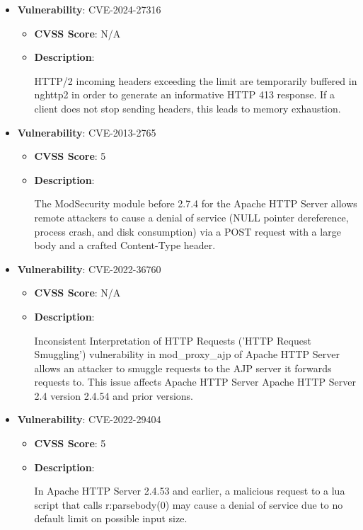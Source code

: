 \documentclass{article}
\begin{document}
\begin{itemize}
    
        \item \textbf{Vulnerability}: CVE-2024-27316
        \begin{itemize}
            \item \textbf{CVSS Score}:  N/A 
            \item \textbf{Description}:
            \parbox[t]{0.9\linewidth}{
                \ttfamily HTTP/2 incoming headers exceeding the limit are temporarily buffered in nghttp2 in order to generate an informative HTTP 413 response. If a client does not stop sending headers, this leads to memory exhaustion.
            }
        \end{itemize}
    
        \item \textbf{Vulnerability}: CVE-2013-2765
        \begin{itemize}
            \item \textbf{CVSS Score}:  5 
            \item \textbf{Description}:
            \parbox[t]{0.9\linewidth}{
                \ttfamily The ModSecurity module before 2.7.4 for the Apache HTTP Server allows remote attackers to cause a denial of service (NULL pointer dereference, process crash, and disk consumption) via a POST request with a large body and a crafted Content-Type header.
            }
        \end{itemize}
    
        \item \textbf{Vulnerability}: CVE-2022-36760
        \begin{itemize}
            \item \textbf{CVSS Score}:  N/A 
            \item \textbf{Description}:
            \parbox[t]{0.9\linewidth}{
                \ttfamily Inconsistent Interpretation of HTTP Requests ('HTTP Request Smuggling') vulnerability in mod\_proxy\_ajp of Apache HTTP Server allows an attacker to smuggle requests to the AJP server it forwards requests to.  This issue affects Apache HTTP Server Apache HTTP Server 2.4 version 2.4.54 and prior versions.
            }
        \end{itemize}
    
        \item \textbf{Vulnerability}: CVE-2022-29404
        \begin{itemize}
            \item \textbf{CVSS Score}:  5 
            \item \textbf{Description}:
            \parbox[t]{0.9\linewidth}{
                \ttfamily In Apache HTTP Server 2.4.53 and earlier, a malicious request to a lua script that calls r:parsebody(0) may cause a denial of service due to no default limit on possible input size.
            }
        \end{itemize}
    

\end{itemize}
\end{document}
